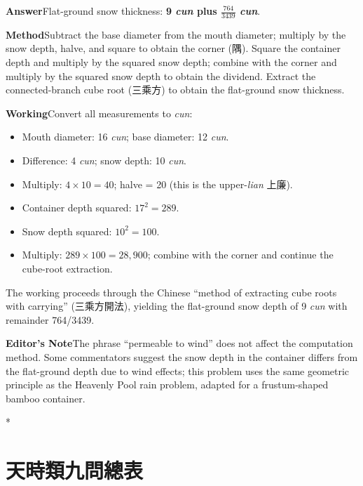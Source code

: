 \documentclass[11pt,a4paper]{article}
\newcommand{\DaEN}{\textbf{\color{headcolor}Answer}}
\newcommand{\ShuEN}{\textbf{\color{headcolor}Method}}
\newcommand{\CaoEN}{\textbf{\color{headcolor}Working}}
\newcommand{\AnEN}{\textbf{\color{headcolor}Editor's Note}}
\begin{document}
\vspace{0.5em}
\DaEN{}\quad Flat-ground snow thickness: \textbf{9 \textit{cun} plus $\frac{764}{3439}$ \textit{cun}}.

\vspace{0.5em}
\ShuEN{}\quad Subtract the base diameter from the mouth diameter; multiply by the snow depth, halve, and square to obtain the corner (隅). Square the container depth and multiply by the squared snow depth; combine with the corner and multiply by the squared snow depth to obtain the dividend. Extract the connected-branch cube root (三乘方) to obtain the flat-ground snow thickness.

\vspace{0.5em}
\CaoEN{}\quad Convert all measurements to \textit{cun}:
\begin{itemize}[noitemsep,topsep=0pt]
  \item Mouth diameter: 16 \textit{cun}; base diameter: 12 \textit{cun}.
  \item Difference: 4 \textit{cun}; snow depth: 10 \textit{cun}.
  \item Multiply: $4 \times 10 = 40$; halve = 20 (this is the upper-\textit{lian} 上廉).
  \item Container depth squared: $17^2 = 289$.
  \item Snow depth squared: $10^2 = 100$.
  \item Multiply: $289 \times 100 = 28{,}900$; combine with the corner and continue the cube-root extraction.
\end{itemize}
The working proceeds through the Chinese ``method of extracting cube roots with carrying'' (三乘方開法), yielding the flat-ground snow depth of 9 \textit{cun} with remainder 764/3439.

\vspace{0.5em}
\AnEN{}\quad The phrase ``permeable to wind'' does not affect the computation method. Some commentators suggest the snow depth in the container differs from the flat-ground depth due to wind effects; this problem uses the same geometric principle as the Heavenly Pool rain problem, adapted for a frustum-shaped bamboo container.

\newpage

\switchcolumn[0]*
\section*{天時類九問總表}
\end{document}
